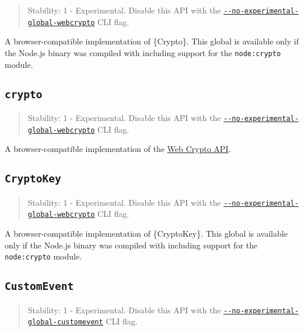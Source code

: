 \begin{quote}
Stability: 1 - Experimental. Disable this API with the
\href{cli.md\#--no-experimental-global-webcrypto}{\texttt{-\/-no-experimental-global-webcrypto}}
CLI flag.
\end{quote}

A browser-compatible implementation of \{Crypto\}. This global is
available only if the Node.js binary was compiled with including support
for the \texttt{node:crypto} module.

\subsection{\texorpdfstring{\texttt{crypto}}{crypto}}\label{crypto-1}

\begin{quote}
Stability: 1 - Experimental. Disable this API with the
\href{cli.md\#--no-experimental-global-webcrypto}{\texttt{-\/-no-experimental-global-webcrypto}}
CLI flag.
\end{quote}

A browser-compatible implementation of the \href{webcrypto.md}{Web
Crypto API}.

\subsection{\texorpdfstring{\texttt{CryptoKey}}{CryptoKey}}\label{cryptokey}

\begin{quote}
Stability: 1 - Experimental. Disable this API with the
\href{cli.md\#--no-experimental-global-webcrypto}{\texttt{-\/-no-experimental-global-webcrypto}}
CLI flag.
\end{quote}

A browser-compatible implementation of \{CryptoKey\}. This global is
available only if the Node.js binary was compiled with including support
for the \texttt{node:crypto} module.

\subsection{\texorpdfstring{\texttt{CustomEvent}}{CustomEvent}}\label{customevent}

\begin{quote}
Stability: 1 - Experimental. Disable this API with the
\href{cli.md\#--no-experimental-global-customevent}{\texttt{-\/-no-experimental-global-customevent}}
CLI flag.
\end{quote}

